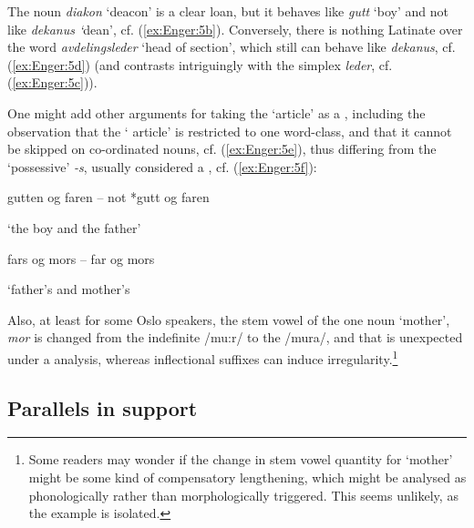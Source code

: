 \documentclass[output=paper]{langsci/langscibook}
\begin{document}
\begin{exe}
\begin{xlist}
\begin{xlist}



\z\z

The noun \emph{diakon} `deacon' is a clear loan, but it behaves like
\emph{gutt} `boy' and not like \emph{dekanus `}dean', cf. (\ref{ex:Enger:5b}). Conversely,
there is nothing Latinate over the word \emph{avdelings\-le\-der} `head of
section', which still can behave like \emph{dekanus}, cf. (\ref{ex:Enger:5d}) (and
contrasts intriguingly with the simplex \emph{leder}, cf. (\ref{ex:Enger:5c})).

One might add other arguments for taking the `article' as a ,
including the observation that the ` article' is restricted to
one word-class, and that it cannot be skipped on co-ordinated nouns, cf.
(\ref{ex:Enger:5e}), thus differing from the `possessive' \emph{-s}, usually considered a
, cf. (\ref{ex:Enger:5f}):

\ea\label{ex:Enger:5ef}
\ea\label{ex:Enger:5e} {gutten og faren --} not *{gutt og faren }

\glt `the boy and the father'

\ex\label{ex:Enger:5f} {fars og mors -- far og mors }

\glt `father's and mother's
\z\z

Also, at least for some Oslo speakers, the stem vowel of the one noun
`mother', \emph{mor} is changed from the indefinite /mu:r/ to the
 /mura/, and that is unexpected under a  analysis, whereas
inflectional suffixes can induce irregularity.\footnote{Some readers may
  wonder if the change in stem vowel quantity for `mother' might be some
  kind of compensatory lengthening, which might be analysed as
  phonologically rather than morphologically triggered. This seems
  unlikely, as the example is isolated.}

\subsection{Parallels in support}
\label{sec:enger:2.4}


\end{xlist}
\end{xlist}
\end{exe}
\end{document}
